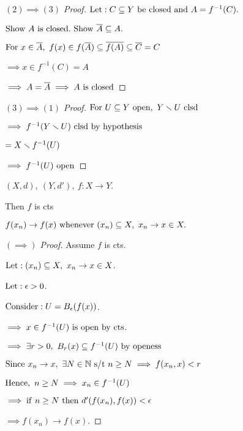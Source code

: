 \documentclass[12pt]{article}
\begin{document}
\bboxproof
\begin{proof}[\((2)\implies(3)\) Proof]
    \(\llet:C\ssq Y\ \TR{be\ closed\ and}\ A=f^{-1}(C).\)

    \(\TR{Show}\ A\ \is\ \TR{closed}.\ \TR{Show}\ \cls{A}\ssq A.\)

    \(\mathrm{For}\ x\in\overline{A},\ f(x)\in f(\overline{A})\subseteq\overline{f(A)}\subseteq \overline{C}=C\)

    \(\implies x\in f^{-1}(C)=A\)

    \(\implies A=\cls{A}\implies A\ \is\ \TR{closed}\)
\end{proof}
\ebox

\bboxproof
\begin{proof}[\((3)\implies(1)\) Proof]
    \(\TR{For}\ U\ssq Y\ \TR{open},\ Y\smin U\ \TR{clsd}\)

    \(\implies f^{-1}(Y\smin U)\ \TR{clsd\ by\ hypothesis}\)

    \(=X\smallsetminus f^{-1}(U)\)
    
    \(\implies f^{-1}(U)\ \TR{open}\)
\end{proof}
\ebox


\bboxprop
\begin{prop}
    \((X,d),\ (Y,d'),\ f:X\to Y\).

    Then \(f\) is cts 

    \(f(x_n)\to f(x)\ \mathrm{whenever}\ (x_n)\subseteq X,\ x_n\to x\in X.\)
\end{prop}
\ebox

\bboxproof
\begin{proof}[\((\implies)\) Proof]
    Assume \(f\) is cts.

    \(\mathrm{Let}:(x_n)\subseteq X,\ x_n\to x\in X\).

    \(\mathrm{Let}:\epsilon>0\).

    \(\mathrm{Consider}:U=B_\epsilon(f(x))\).

    \(\implies x\in f^{-1}(U)\ \is\ \TR{open\ by\ cts}\).

    \(\implies\exists r>0,\ B_r(x)\subseteq f^{-1}(U)\ \mathrm{by\ openess}\)

    \(\mathrm{Since}\ x_n\to x,\ \exists N\in\mathbb N\text{ s/t } n\ge N\implies f(x_n,x)<r\)

    \(\mathrm{Hence},\ n\ge N\implies x_n\in f^{-1}(U)\)

    \(\implies\mathrm{if}\ n\ge N\ \mathrm{then}\ d'(f(x_n), f(x))<\epsilon\)

    \(\implies f(x_n)\to f(x)\).
\end{proof}
\ebox
\end{document}
